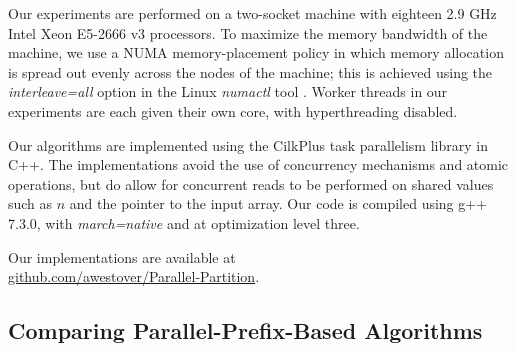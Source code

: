 \documentclass[sigplan, 10pt, nonacm]{acmart}
\newcommand{\github}{\url{github.com/awestover/Parallel-Partition}}
\newcommand{\defn}[1]{{\textit{\textbf{\boldmath #1}}}}
\renewcommand{\paragraph}[1]{\vspace{0.09in}\noindent{\bf \boldmath #1.}}
\theoremstyle{remark}
\theoremstyle{remark}
\begin{document}



\paragraph{Machine Details}
Our experiments are performed on a two-socket machine with eighteen
2.9 GHz Intel Xeon E5-2666 v3 processors. To maximize the memory
bandwidth of the machine, we use a NUMA memory-placement policy in
which memory allocation is spread out evenly across the nodes of the
machine; this is achieved using the \emph{interleave=all} option in
the Linux \emph{numactl} tool \cite{Kleen05}. Worker threads in our
experiments are each given their own core, with hyperthreading
disabled.

Our algorithms are implemented using the CilkPlus task parallelism
library in C++. The implementations avoid the use of concurrency
mechanisms and atomic operations, but do allow for concurrent reads to
be performed on shared values such as $n$ and the pointer to the input
array. Our code is compiled using g++ 7.3.0, with \emph{march=native}
and at optimization level three. 

Our implementations are available at \\ \github.


\subsection{Comparing Parallel-Prefix-Based Algorithms}\label{subsecclassic}
\end{document}
